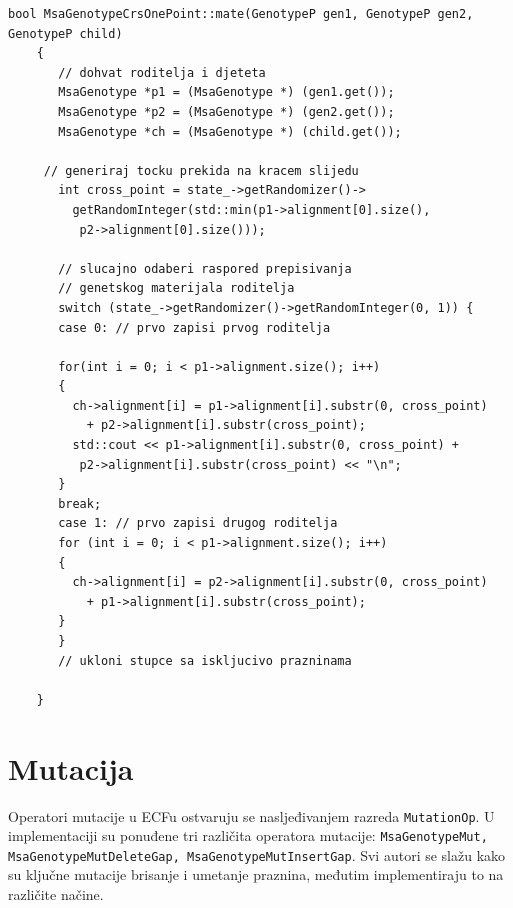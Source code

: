\documentclass[times, utf8, zavrsni, numeric]{fer}
\begin{document}
 
 \begin{lstlisting}[caption=Funkcija \texttt{mate}]
 	bool MsaGenotypeCrsOnePoint::mate(GenotypeP gen1, GenotypeP gen2, GenotypeP child)
 	{
 	   // dohvat roditelja i djeteta
 	   MsaGenotype *p1 = (MsaGenotype *) (gen1.get());
 	   MsaGenotype *p2 = (MsaGenotype *) (gen2.get());
 	   MsaGenotype *ch = (MsaGenotype *) (child.get());
 		
     // generiraj tocku prekida na kracem slijedu
 	   int cross_point = state_->getRandomizer()->
 	     getRandomInteger(std::min(p1->alignment[0].size(), 
 	      p2->alignment[0].size()));
 	
 	   // slucajno odaberi raspored prepisivanja
 	   // genetskog materijala roditelja
 	   switch (state_->getRandomizer()->getRandomInteger(0, 1)) {
 	   case 0: // prvo zapisi prvog roditelja
 	
 	   for(int i = 0; i < p1->alignment.size(); i++)
 	   {
 	     ch->alignment[i] = p1->alignment[i].substr(0, cross_point) 
 	       + p2->alignment[i].substr(cross_point);
 	     std::cout << p1->alignment[i].substr(0, cross_point) +
 	      p2->alignment[i].substr(cross_point) << "\n";
 	   }
 	   break;
 	   case 1: // prvo zapisi drugog roditelja
 	   for (int i = 0; i < p1->alignment.size(); i++)
 	   {
 	     ch->alignment[i] = p2->alignment[i].substr(0, cross_point) 
 	       + p1->alignment[i].substr(cross_point);
 	   }
 	   }
 	   // ukloni stupce sa iskljucivo prazninama
 	    	
 	}
 \end{lstlisting}

 
 \section{Mutacija}
 Operatori mutacije u ECFu ostvaruju se nasljeđivanjem razreda \texttt{MutationOp}. U implementaciji su ponuđene tri različita operatora mutacije: \texttt{MsaGenotypeMut, MsaGenotypeMutDeleteGap, MsaGenotypeMutInsertGap}. Svi autori se slažu kako su ključne mutacije brisanje i umetanje praznina, međutim implementiraju to na različite načine.
 
\end{document}
